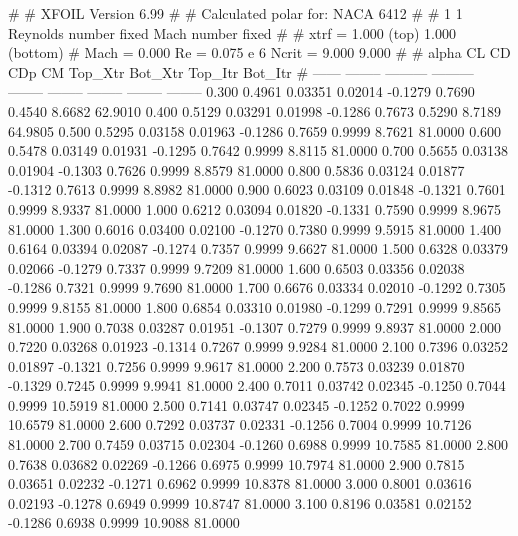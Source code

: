 #  
#       XFOIL         Version 6.99
#  
# Calculated polar for: NACA 6412                                       
#  
# 1 1 Reynolds number fixed          Mach number fixed         
#  
# xtrf =   1.000 (top)        1.000 (bottom)  
# Mach =   0.000     Re =     0.075 e 6     Ncrit =   9.000  9.000
#  
#   alpha    CL        CD       CDp       CM     Top_Xtr  Bot_Xtr  Top_Itr  Bot_Itr
#  ------ -------- --------- --------- -------- -------- -------- -------- --------
   0.300   0.4961   0.03351   0.02014  -0.1279   0.7690   0.4540   8.6682  62.9010
   0.400   0.5129   0.03291   0.01998  -0.1286   0.7673   0.5290   8.7189  64.9805
   0.500   0.5295   0.03158   0.01963  -0.1286   0.7659   0.9999   8.7621  81.0000
   0.600   0.5478   0.03149   0.01931  -0.1295   0.7642   0.9999   8.8115  81.0000
   0.700   0.5655   0.03138   0.01904  -0.1303   0.7626   0.9999   8.8579  81.0000
   0.800   0.5836   0.03124   0.01877  -0.1312   0.7613   0.9999   8.8982  81.0000
   0.900   0.6023   0.03109   0.01848  -0.1321   0.7601   0.9999   8.9337  81.0000
   1.000   0.6212   0.03094   0.01820  -0.1331   0.7590   0.9999   8.9675  81.0000
   1.300   0.6016   0.03400   0.02100  -0.1270   0.7380   0.9999   9.5915  81.0000
   1.400   0.6164   0.03394   0.02087  -0.1274   0.7357   0.9999   9.6627  81.0000
   1.500   0.6328   0.03379   0.02066  -0.1279   0.7337   0.9999   9.7209  81.0000
   1.600   0.6503   0.03356   0.02038  -0.1286   0.7321   0.9999   9.7690  81.0000
   1.700   0.6676   0.03334   0.02010  -0.1292   0.7305   0.9999   9.8155  81.0000
   1.800   0.6854   0.03310   0.01980  -0.1299   0.7291   0.9999   9.8565  81.0000
   1.900   0.7038   0.03287   0.01951  -0.1307   0.7279   0.9999   9.8937  81.0000
   2.000   0.7220   0.03268   0.01923  -0.1314   0.7267   0.9999   9.9284  81.0000
   2.100   0.7396   0.03252   0.01897  -0.1321   0.7256   0.9999   9.9617  81.0000
   2.200   0.7573   0.03239   0.01870  -0.1329   0.7245   0.9999   9.9941  81.0000
   2.400   0.7011   0.03742   0.02345  -0.1250   0.7044   0.9999  10.5919  81.0000
   2.500   0.7141   0.03747   0.02345  -0.1252   0.7022   0.9999  10.6579  81.0000
   2.600   0.7292   0.03737   0.02331  -0.1256   0.7004   0.9999  10.7126  81.0000
   2.700   0.7459   0.03715   0.02304  -0.1260   0.6988   0.9999  10.7585  81.0000
   2.800   0.7638   0.03682   0.02269  -0.1266   0.6975   0.9999  10.7974  81.0000
   2.900   0.7815   0.03651   0.02232  -0.1271   0.6962   0.9999  10.8378  81.0000
   3.000   0.8001   0.03616   0.02193  -0.1278   0.6949   0.9999  10.8747  81.0000
   3.100   0.8196   0.03581   0.02152  -0.1286   0.6938   0.9999  10.9088  81.0000
